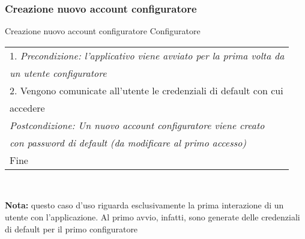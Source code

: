 \begin{minipage}{\textwidth}
    \subsubsection{Creazione nuovo account configuratore}
    \usecase
        {Creazione nuovo account configuratore}
        {Configuratore}
        {
            \begin{tabular}{l}
                1. \textit{Precondizione: l'applicativo viene avviato per la prima volta da}\\
                \textit{un utente configuratore}\\
                2. Vengono comunicate all'utente le credenziali di default con cui\\accedere\\
                \textit{Postcondizione: Un nuovo account configuratore viene creato} \\
                \textit{con password di default (da modificare al primo accesso)}\\
                Fine
            \end{tabular} \\
            
        }
        \vspace{0.5cm}
        \textbf{Nota:} questo caso d'uso riguarda esclusivamente la prima interazione di un
        utente con l'applicazione. Al primo avvio, infatti, sono generate delle credenziali
        di default per il primo configuratore
\end{minipage}